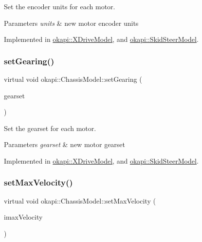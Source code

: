 Set the encoder units for each motor.


\begin{DoxyParams}{Parameters}
{\em units} & new motor encoder units \\
\hline
\end{DoxyParams}


Implemented in \mbox{\hyperlink{classokapi_1_1XDriveModel_a56b590280c856259ad710e888d8e215c}{okapi\+::\+X\+Drive\+Model}}, and \mbox{\hyperlink{classokapi_1_1SkidSteerModel_a8922c028a9f09893061938fe50fb2a79}{okapi\+::\+Skid\+Steer\+Model}}.

\mbox{\label{classokapi_1_1ChassisModel_a960d6ce2f21e5832fce1d7566408cb61}} 
\subsubsection{\texorpdfstring{setGearing()}{setGearing()}}
{\footnotesize\ttfamily virtual void okapi\+::\+Chassis\+Model\+::set\+Gearing (\begin{DoxyParamCaption}\item[{\mbox{\hyperlink{classokapi_1_1AbstractMotor_a88aaa6ea2fa10f5520a537bbf26774d5}{Abstract\+Motor\+::gearset}}}]{gearset }\end{DoxyParamCaption})\hspace{0.3cm}{\ttfamily [pure virtual]}}

Set the gearset for each motor.


\begin{DoxyParams}{Parameters}
{\em gearset} & new motor gearset \\
\hline
\end{DoxyParams}


Implemented in \mbox{\hyperlink{classokapi_1_1XDriveModel_ae9205c16e581786fecabaeb5066edab6}{okapi\+::\+X\+Drive\+Model}}, and \mbox{\hyperlink{classokapi_1_1SkidSteerModel_ad890989e345cfd7455436bc5dd6efdcc}{okapi\+::\+Skid\+Steer\+Model}}.

\mbox{\label{classokapi_1_1ChassisModel_ae7fcb4cc95fdd7fd3c8f8388b4a698b2}} 
\subsubsection{\texorpdfstring{setMaxVelocity()}{setMaxVelocity()}}
{\footnotesize\ttfamily virtual void okapi\+::\+Chassis\+Model\+::set\+Max\+Velocity (\begin{DoxyParamCaption}\item[{double}]{imax\+Velocity }\end{DoxyParamCaption})\hspace{0.3cm}{\ttfamily [pure virtual]}}

